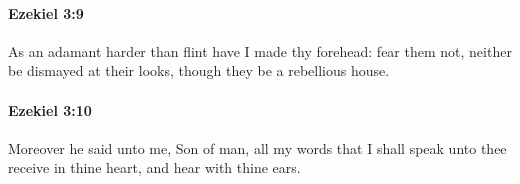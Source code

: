 		\paragraph{Ezekiel 3:9} %
			\label{EZEKIEL-3-9}

			As an adamant harder than flint have I made thy forehead: fear them not, neither be dismayed at their looks, though they be a rebellious house.


		\paragraph{Ezekiel 3:10} %
			\label{EZEKIEL-3-10}

			Moreover he said unto me, Son of man, all my words that I shall speak unto thee receive in thine heart, and hear with thine ears.



